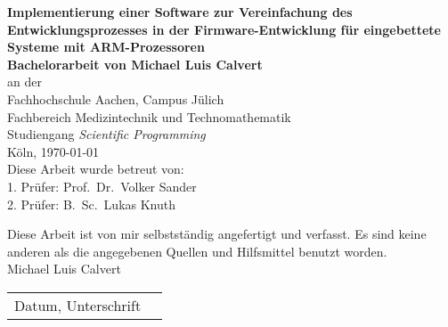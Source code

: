 \documentclass[12pt,a4paper, twoside]{article}
\author{}
\title{}
\date{}
\newcommand\blankpage{%
    \null
    \thispagestyle{empty}%
    \addtocounter{page}{-1}%
    \newpage}
\begin{document}
	\pagestyle{empty}
	
	\begin{center}
		{
		\Large\bf
		Implementierung einer Software zur Vereinfachung des Entwicklungsprozesses in
		der Firmware-Entwicklung für eingebettete Systeme mit ARM-Prozessoren
		}\\[3cm]

		{\bf Bachelorarbeit von Michael Luis Calvert}\\[1.5cm]

		an der\\
		Fachhochschule Aachen, Campus Jülich\\
		Fachbereich Medizintechnik und Technomathematik\\
		Studiengang {\em Scientific Programming}\\[3cm]

		Köln, \today\\[3cm]

		Diese Arbeit wurde betreut von:\\[0,2cm]
		1. Prüfer: Prof.~Dr.~Volker Sander\\
		2. Prüfer: B.~Sc.~Lukas Knuth

	\end{center}




	\newpage
	\blankpage
	Diese Arbeit ist von mir selbstständig angefertigt und verfasst.
	Es sind keine anderen als die angegebenen Quellen und Hilfsmittel benutzt worden.\\[3cm]
	Michael Luis Calvert\\[3cm]
	\begin{tabular}{p{10cm}@{}l@{}}\hline
	Datum, Unterschrift
	\end{tabular}
	
	\newpage
	\blankpage
	
\end{document}
